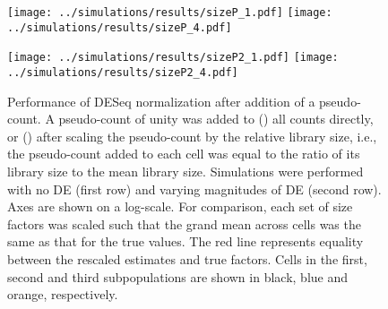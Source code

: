 \documentclass{article}
\begin{document}
\begin{figure}[btp]
    \begin{center}
        \begin{minipage}{0.33\textwidth}
            \texttt{[image: ../simulations/results/sizeP\_1.pdf]}
            \texttt{[image: ../simulations/results/sizeP\_4.pdf]}
            \subcaption{}\label{subfig:size_prior}
        \end{minipage}
        \begin{minipage}{0.33\textwidth}
            \texttt{[image: ../simulations/results/sizeP2\_1.pdf]}
            \texttt{[image: ../simulations/results/sizeP2\_4.pdf]}
            \subcaption{}\label{subfig:size_libprior}
        \end{minipage}
    \end{center}
    \caption{
        Performance of DESeq normalization after addition of a pseudo-count.
        A pseudo-count of unity was added to () all counts directly, or () after scaling the pseudo-count by the relative library size, i.e., the pseudo-count added to each cell was equal to the ratio of its library size to the mean library size.
        Simulations were performed with no DE (first row) and varying magnitudes of DE (second row).
        Axes are shown on a log-scale.
        For comparison, each set of size factors was scaled such that the grand mean across cells was the same as that for the true values.
        The red line represents equality between the rescaled estimates and true factors.
        Cells in the first, second and third subpopulations are shown in black, blue and orange, respectively.
    }
\end{figure}
\end{document}
